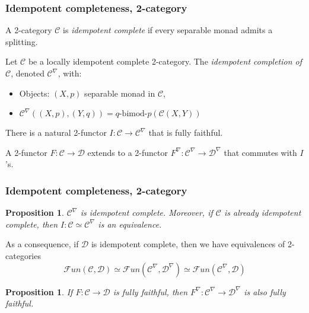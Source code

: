 \documentclass{beamer}
\newtheorem{proposition}[theorem]{Proposition}
\newcommand{\cC}{{\mathcal{C}}}
\newcommand{\cD}{{\mathcal{D}}}
\newcommand{\cFun}{{\mathcal{F}un}}
\newcommand{\bimod}[2]{{#1\textrm{-bimod-}#2}}
\begin{document}
\begin{frame}
\frametitle{Idempotent completeness, 2-category}

\begin{definition}
A 2-category $\cC$ is \emph{idempotent complete}
if every separable monad admits a splitting.
\end{definition}

\pause

\begin{definition}
Let $\cC$ be a locally idempotent complete 2-category.
The \emph{idempotent completion of $\cC$},
denoted $\cC^\nabla$, with:
\begin{itemize}
\item Objects: $(X,p)$ separable monad in $\cC$,
\item $\cC^\nabla((X,p),(Y,q)) = \bimod{q}{p}(\cC(X,Y))$
\end{itemize}

\pause

There is a natural 2-functor $I: \cC \to \cC^\nabla$
that is fully faithful.

\pause

A 2-functor $F: \cC \to \cD$
extends to a 2-functor $F^\nabla: \cC^\nabla \to \cD^\nabla$
that commutes with $I$'s.
\end{definition}

\end{frame}

\begin{frame}
\frametitle{Idempotent completeness, 2-category}

\begin{proposition}
$\cC^\nabla$ is idempotent complete.
Moreover, if $\cC$ is already idempotent complete,
then $I: \cC \simeq \cC^\nabla$ is an equivalence.
\end{proposition}

\pause

As a consequence, if $\cD$ is idempotent complete,
then we have equivalences of 2-categories
\[
\cFun(\cC,\cD) \simeq \cFun(\cC^\nabla,\cD^\nabla)
\simeq \cFun(\cC^\nabla, \cD)
\]

\pause

\begin{proposition}
If $F: \cC \to \cD$ is fully faithful,
then $F^\nabla: \cC^\nabla \to \cD^\nabla$
is also fully faithful.
\end{proposition}

\end{frame}
\end{document}
